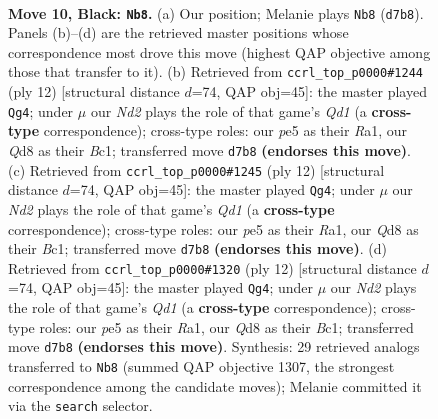 \documentclass[11pt]{article}
\begin{document}
\clearpage

\begin{figure}[p]\centering
\begin{subfigure}{0.46\textwidth}\centering
\resizebox{\linewidth}{!}{%
\newchessgame
\chessboard[
  setfen={r1bqkb1r/p2n1ppp/2p1p3/2ppP3/3P2PP/2P5/PP1N1P2/R1BQK1NR b KQq - 0 10},
  showmover=false,
  pgfstyle=straightmove, color=movearrow, markmove={d7-b8}
]}
\caption{}
\end{subfigure}\hfill
\begin{subfigure}{0.46\textwidth}\centering
\resizebox{\linewidth}{!}{%
\newchessgame
\chessboard[
  setfen={rnbqk2r/pp2nppp/4p3/2ppP3/3P4/P1P5/2P2PPP/R1BQKBNR w KQkq - 1 7},
  showmover=false,
  pgfstyle=straightmove, color=movearrow, markmove={d1-g4}
]}
\caption{}
\end{subfigure}
\\[4pt]
\begin{subfigure}{0.46\textwidth}\centering
\resizebox{\linewidth}{!}{%
\newchessgame
\chessboard[
  setfen={rnbqk2r/pp2nppp/4p3/2ppP3/3P4/P1P5/2P2PPP/R1BQKBNR w KQkq - 1 7},
  showmover=false,
  pgfstyle=straightmove, color=movearrow, markmove={d1-g4}
]}
\caption{}
\end{subfigure}\hfill
\begin{subfigure}{0.46\textwidth}\centering
\resizebox{\linewidth}{!}{%
\newchessgame
\chessboard[
  setfen={rnbqk2r/pp2nppp/4p3/2ppP3/3P4/P1P5/2P2PPP/R1BQKBNR w KQkq - 1 7},
  showmover=false,
  pgfstyle=straightmove, color=movearrow, markmove={d1-g4}
]}
\caption{}
\end{subfigure}
\caption{\textbf{Move 10, Black: \texttt{Nb8}.} (a) Our position; Melanie plays \texttt{Nb8} (\texttt{d7b8}). Panels (b)--(d) are the retrieved master positions whose correspondence most drove this move (highest QAP objective among those that transfer to it). (b) Retrieved from \texttt{ccrl\_top\_p0000\#1244} (ply 12) [structural distance $d$=74, QAP obj=45]: the master played \texttt{Qg4}; under $\mu$ our \emph{Nd2} plays the role of that game's \emph{Qd1} (a \textbf{cross-type} correspondence); cross-type roles: our \emph{p}e5 as their \emph{R}a1, our \emph{Q}d8 as their \emph{B}c1; transferred move \texttt{d7b8} \textbf{(endorses this move)}. (c) Retrieved from \texttt{ccrl\_top\_p0000\#1245} (ply 12) [structural distance $d$=74, QAP obj=45]: the master played \texttt{Qg4}; under $\mu$ our \emph{Nd2} plays the role of that game's \emph{Qd1} (a \textbf{cross-type} correspondence); cross-type roles: our \emph{p}e5 as their \emph{R}a1, our \emph{Q}d8 as their \emph{B}c1; transferred move \texttt{d7b8} \textbf{(endorses this move)}. (d) Retrieved from \texttt{ccrl\_top\_p0000\#1320} (ply 12) [structural distance $d$=74, QAP obj=45]: the master played \texttt{Qg4}; under $\mu$ our \emph{Nd2} plays the role of that game's \emph{Qd1} (a \textbf{cross-type} correspondence); cross-type roles: our \emph{p}e5 as their \emph{R}a1, our \emph{Q}d8 as their \emph{B}c1; transferred move \texttt{d7b8} \textbf{(endorses this move)}. Synthesis: 29 retrieved analogs transferred to \texttt{Nb8} (summed QAP objective 1307, the strongest correspondence among the candidate moves); Melanie committed it via the \texttt{search} selector.}
\label{fig:thought-m19}
\end{figure}
\end{document}
